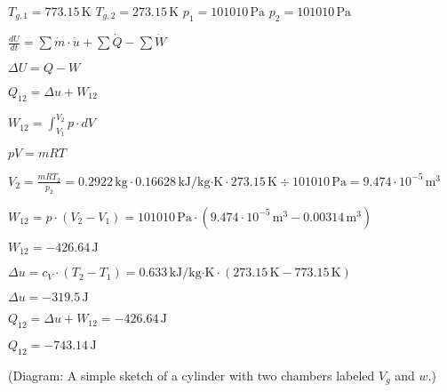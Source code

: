 \( T_{g,1} = 773.15 \, \text{K} \)  
\( T_{g,2} = 273.15 \, \text{K} \)  
\( p_1 = 101010 \, \text{Pa} \)  
\( p_2 = 101010 \, \text{Pa} \)  

\( \frac{dU}{dt} = \sum \dot{m} \cdot \dot{u} + \sum \dot{Q} - \sum \dot{W} \)  

\( \Delta U = Q - W \)  

\( Q_{12} = \Delta u + W_{12} \)  

\( W_{12} = \int_{V_1}^{V_2} p \cdot dV \)  

\( pV = mRT \)  

\( V_2 = \frac{mRT_2}{p_2} = 0.2922 \, \text{kg} \cdot 0.16628 \, \text{kJ/kg·K} \cdot 273.15 \, \text{K} \div 101010 \, \text{Pa} = 9.474 \cdot 10^{-5} \, \text{m}^3 \)  

\( W_{12} = p \cdot (V_2 - V_1) = 101010 \, \text{Pa} \cdot (9.474 \cdot 10^{-5} \, \text{m}^3 - 0.00314 \, \text{m}^3) \)  

\( W_{12} = -426.64 \, \text{J} \)  

\( \Delta u = c_V \cdot (T_2 - T_1) = 0.633 \, \text{kJ/kg·K} \cdot (273.15 \, \text{K} - 773.15 \, \text{K}) \)  

\( \Delta u = -319.5 \, \text{J} \)  

\( Q_{12} = \Delta u + W_{12} = -426.64 \, \text{J} \)  

\( Q_{12} = -743.14 \, \text{J} \)  

(Diagram: A simple sketch of a cylinder with two chambers labeled \( V_g \) and \( w \).)